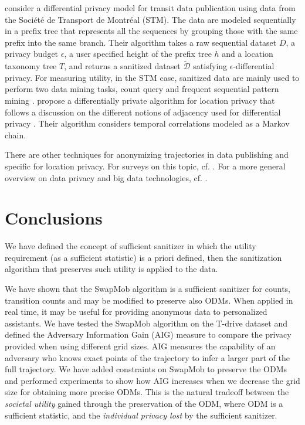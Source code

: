 \documentclass[times,twocolumn,final,authoryear]{elsarticle}
\begin{document}
\cite{Chen:2012} consider a differential privacy model for transit data publication using data from the Soci\'{e}t\'{e} de Transport de Montr\'{e}al (STM). 
The data are modeled sequentially in a prefix tree that represents all the sequences by grouping those with the same prefix into the same branch.
Their algorithm takes a raw sequential dataset $D$, a privacy budget $\epsilon$, a user specified height of the prefix tree $h$ and a location taxonomy tree $T$, and returns a sanitized dataset $\tilde{\mathcal{D}}$ satisfying $\epsilon$-differential privacy.
For measuring utility, in the STM case, sanitized data are mainly used to perform two
data mining tasks, count query and frequent sequential pattern mining \citep{Agrawal:1995}.
\cite{Xiao:2015} propose a differentially private algorithm for location privacy that follows a discussion on the different notions of adjacency used for  differential privacy \cite{Chatzik:2013,Kifer:2011}.
Their algorithm considers temporal correlations modeled as a Markov chain.

{\color{blue}
There are other techniques for anonymizing trajectories in data publishing and specific for
location privacy. For surveys on this topic, cf. \cite{Fiore:2019} \cite{Primault:2019}.
For a more general overview on data privacy and big data technologies, cf. \cite{Torra:book}}.  
\section{Conclusions}\label{Sec:conclusions}
We have defined the concept of sufficient sanitizer in which the utility requirement (as a sufficient statistic) is a priori defined, then the sanitization algorithm that preserves such utility is applied to the data.

{\color{blue}
We have shown that the SwapMob algorithm is a sufficient sanitizer for counts, transition counts and may be modified to preserve also ODMs.
When applied in real time, it may be useful for providing anonymous data to personalized assistants. 
We have tested the SwapMob algorithm on the T-drive dataset and defined 
the Adversary Information Gain (AIG) measure to compare the privacy provided when using different grid sizes.
AIG measures the capability of an adversary who knows exact points of the trajectory to infer a larger part of the full trajectory.
We have added constraints on SwapMob to preserve the ODMs and performed experiments to show how AIG
increases when we decrease the grid size for obtaining more precise ODMs.}
This is the natural tradeoff between the {\em societal utility} gained through the preservation of the ODM, where ODM is a sufficient statistic, and the {\em individual privacy lost} by the sufficient sanitizer.
\end{document}
